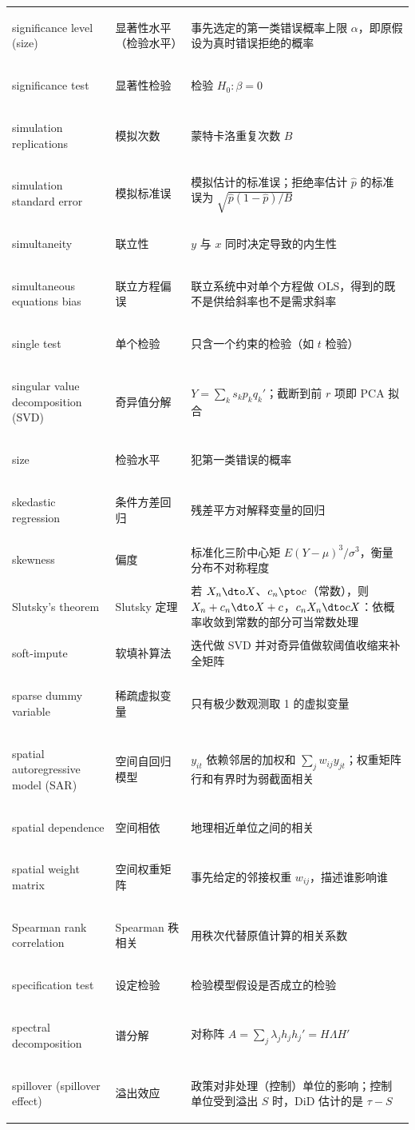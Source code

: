 \begin{longtable}{@{}>{\bfseries\boldmath\raggedright\arraybackslash}p{4.6cm}>{\raggedright\arraybackslash}p{3.2cm}>{\raggedright\arraybackslash}p{\dimexpr\textwidth-7.8cm-4\tabcolsep\relax}@{}}
significance level (size) & 显著性水平（检验水平） & 事先选定的第一类错误概率上限 $\alpha$，即原假设为真时错误拒绝的概率 \\
significance test & 显著性检验 & 检验 $H_0:\beta=0$ \\
simulation replications & 模拟次数 & 蒙特卡洛重复次数 $B$ \\
simulation standard error & 模拟标准误 & 模拟估计的标准误；拒绝率估计 $\hat p$ 的标准误为 $\sqrt{\hat p(1-\hat p)/B}$ \\
simultaneity & 联立性 & $y$ 与 $x$ 同时决定导致的内生性 \\
simultaneous equations bias & 联立方程偏误 & 联立系统中对单个方程做 OLS，得到的既不是供给斜率也不是需求斜率 \\
single test & 单个检验 & 只含一个约束的检验（如 $t$ 检验） \\
singular value decomposition (SVD) & 奇异值分解 & $Y=\sum_ks_kp_kq_k'$；截断到前 $r$ 项即 PCA 拟合 \\
size & 检验水平 & 犯第一类错误的概率 \\
skedastic regression & 条件方差回归 & 残差平方对解释变量的回归 \\
skewness & 偏度 & 标准化三阶中心矩 $E(Y-\mu)^3/\sigma^3$，衡量分布不对称程度 \\
Slutsky's theorem & Slutsky 定理 & 若 $X_n\dto X$、$c_n\pto c$（常数），则 $X_n+c_n\dto X+c$，$c_nX_n\dto cX$：依概率收敛到常数的部分可当常数处理 \\
soft-impute & 软填补算法 & 迭代做 SVD 并对奇异值做软阈值收缩来补全矩阵 \\
sparse dummy variable & 稀疏虚拟变量 & 只有极少数观测取 1 的虚拟变量 \\
spatial autoregressive model (SAR) & 空间自回归模型 & $y_{it}$ 依赖邻居的加权和 $\sum_jw_{ij}y_{jt}$；权重矩阵行和有界时为弱截面相关 \\
spatial dependence & 空间相依 & 地理相近单位之间的相关 \\
spatial weight matrix & 空间权重矩阵 & 事先给定的邻接权重 $w_{ij}$，描述谁影响谁 \\
Spearman rank correlation & Spearman 秩相关 & 用秩次代替原值计算的相关系数 \\
specification test & 设定检验 & 检验模型假设是否成立的检验 \\
spectral decomposition & 谱分解 & 对称阵 $A=\sum_j\lambda_jh_jh_j'=H\Lambda H'$ \\
spillover (spillover effect) & 溢出效应 & 政策对非处理（控制）单位的影响；控制单位受到溢出 $S$ 时，DiD 估计的是 $\tau-S$ \\

\end{longtable}
